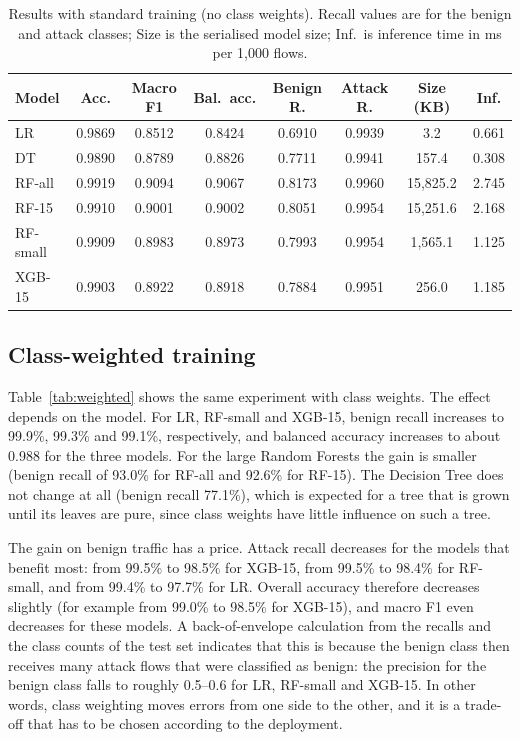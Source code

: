 \documentclass[runningheads]{llncs}
\begin{document}
\begin{table}[t]
\caption{Results with standard training (no class weights). Recall values are for the benign and attack classes; Size is the serialised model size; Inf.\ is inference time in ms per 1,000 flows.}
\label{tab:standard}
\centering
\scriptsize
\setlength{\tabcolsep}{3pt}
\begin{tabular}{lccccccc}
\toprule
Model & Acc. & Macro F1 & Bal.\ acc. & Benign R. & Attack R. & Size (KB) & Inf. \\
\midrule
LR & 0.9869 & 0.8512 & 0.8424 & 0.6910 & 0.9939 & 3.2 & 0.661 \\
DT & 0.9890 & 0.8789 & 0.8826 & 0.7711 & 0.9941 & 157.4 & 0.308 \\
RF-all & 0.9919 & 0.9094 & 0.9067 & 0.8173 & 0.9960 & 15,825.2 & 2.745 \\
RF-15 & 0.9910 & 0.9001 & 0.9002 & 0.8051 & 0.9954 & 15,251.6 & 2.168 \\
RF-small & 0.9909 & 0.8983 & 0.8973 & 0.7993 & 0.9954 & 1,565.1 & 1.125 \\
XGB-15 & 0.9903 & 0.8922 & 0.8918 & 0.7884 & 0.9951 & 256.0 & 1.185 \\
\bottomrule
\end{tabular}
\end{table}

\subsection{Class-weighted training}
Table~\ref{tab:weighted} shows the same experiment with class weights. The effect depends on the model. For LR, RF-small and XGB-15, benign recall increases to 99.9\%, 99.3\% and 99.1\%, respectively, and balanced accuracy increases to about 0.988 for the three models. For the large Random Forests the gain is smaller (benign recall of 93.0\% for RF-all and 92.6\% for RF-15). The Decision Tree does not change at all (benign recall 77.1\%), which is expected for a tree that is grown until its leaves are pure, since class weights have little influence on such a tree.

The gain on benign traffic has a price. Attack recall decreases for the models that benefit most: from 99.5\% to 98.5\% for XGB-15, from 99.5\% to 98.4\% for RF-small, and from 99.4\% to 97.7\% for LR. Overall accuracy therefore decreases slightly (for example from 99.0\% to 98.5\% for XGB-15), and macro F1 even decreases for these models. A back-of-envelope calculation from the recalls and the class counts of the test set indicates that this is because the benign class then receives many attack flows that were classified as benign: the precision for the benign class falls to roughly 0.5--0.6 for LR, RF-small and XGB-15. In other words, class weighting moves errors from one side to the other, and it is a trade-off that has to be chosen according to the deployment.
\end{document}
